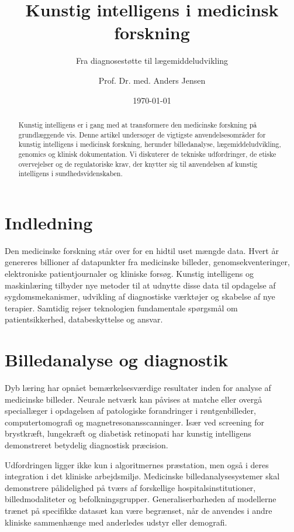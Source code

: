 \documentclass[
    language=danish,
    doctype=article,
]{../../omnilatex}
\title{Kunstig intelligens i medicinsk forskning}
\subtitle{Fra diagnosestøtte til lægemiddeludvikling}
\author{Prof. Dr. med. Anders Jensen}
\date{\today}
\begin{document}
\maketitle

\begin{abstract}
Kunstig intelligens er i gang med at transformere den medicinske forskning på grundlæggende vis. Denne artikel undersøger de vigtigste anvendelsesområder for kunstig intelligens i medicinsk forskning, herunder billedanalyse, lægemiddeludvikling, genomics og klinisk dokumentation. Vi diskuterer de tekniske udfordringer, de etiske overvejelser og de regulatoriske krav, der knytter sig til anvendelsen af kunstig intelligens i sundhedsvidenskaben.
\end{abstract}

\section{Indledning}
Den medicinske forskning står over for en hidtil uset mængde data. Hvert år genereres billioner af datapunkter fra medicinske billeder, genomsekventeringer, elektroniske patientjournaler og kliniske forsøg. Kunstig intelligens og maskinlæring tilbyder nye metoder til at udnytte disse data til opdagelse af sygdomsmekanismer, udvikling af diagnostiske værktøjer og skabelse af nye terapier. Samtidig rejser teknologien fundamentale spørgsmål om patientsikkerhed, databeskyttelse og ansvar.

\section{Billedanalyse og diagnostik}
Dyb læring har opnået bemærkelsesværdige resultater inden for analyse af medicinske billeder. Neurale netværk kan påvises at matche eller overgå speciallæger i opdagelsen af patologiske forandringer i røntgenbilleder, computertomografi og magnetresonansscanninger. Især ved screening for brystkræft, lungekræft og diabetisk retinopati har kunstig intelligens demonstreret betydelig diagnostisk præcision.

Udfordringen ligger ikke kun i algoritmernes præstation, men også i deres integration i det kliniske arbejdsmiljø. Medicinske billedanalysesystemer skal demonstrere pålidelighed på tværs af forskellige hospitalsinstitutioner, billedmodaliteter og befolkningsgrupper. Generaliserbarheden af modellerne trænet på specifikke datasæt kan være begrænset, når de anvendes i andre kliniske sammenhænge med anderledes udstyr eller demografi.
\end{document}
